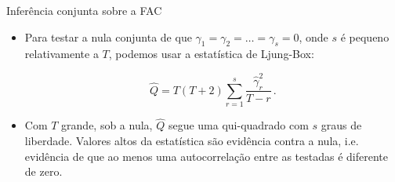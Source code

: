 \documentclass[11pt]{beamer}
\begin{document}
\begin{frame}{Inferência conjunta sobre a FAC}
	\begin{itemize}
	 	\item Para testar a nula conjunta de que $\gamma_{1} = \gamma_{2}=\ldots = \gamma_{s} = 0$, onde $s$ é pequeno relativamente a $T$, podemos usar a {\color{blue}estatística de Ljung-Box}:
		
		$$\hat{Q}= T(T+2)\sum_{r=1}^s \frac{\hat{\gamma}_r^2}{T-r}\, .$$
		\item Com $T$ grande, sob a nula, $\hat{Q}$ segue uma qui-quadrado com $s$ graus de liberdade. Valores altos da estatística são evidência contra a nula, i.e. evidência de que ao menos uma autocorrelação entre as testadas é diferente de zero.
	\end{itemize}
\end{frame}
\end{document}
